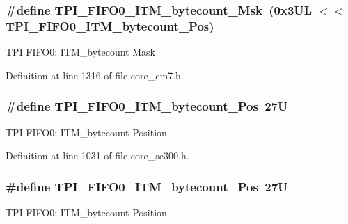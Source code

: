 \subsubsection[{\texorpdfstring{T\+P\+I\+\_\+\+F\+I\+F\+O0\+\_\+\+I\+T\+M\+\_\+bytecount\+\_\+\+Msk}{TPI_FIFO0_ITM_bytecount_Msk}}]{\setlength{\rightskip}{0pt plus 5cm}\#define T\+P\+I\+\_\+\+F\+I\+F\+O0\+\_\+\+I\+T\+M\+\_\+bytecount\+\_\+\+Msk~(0x3\+U\+L $<$$<$ T\+P\+I\+\_\+\+F\+I\+F\+O0\+\_\+\+I\+T\+M\+\_\+bytecount\+\_\+\+Pos)}\hypertarget{group___c_m_s_i_s___t_p_i_ga07bafa971b8daf0d63b3f92b9ae7fa16}{}\label{group___c_m_s_i_s___t_p_i_ga07bafa971b8daf0d63b3f92b9ae7fa16}
T\+PI F\+I\+F\+O0\+: I\+T\+M\+\_\+bytecount Mask 

Definition at line 1316 of file core\+\_\+cm7.\+h.

\subsubsection[{\texorpdfstring{T\+P\+I\+\_\+\+F\+I\+F\+O0\+\_\+\+I\+T\+M\+\_\+bytecount\+\_\+\+Pos}{TPI_FIFO0_ITM_bytecount_Pos}}]{\setlength{\rightskip}{0pt plus 5cm}\#define T\+P\+I\+\_\+\+F\+I\+F\+O0\+\_\+\+I\+T\+M\+\_\+bytecount\+\_\+\+Pos~27U}\hypertarget{group___c_m_s_i_s___t_p_i_gac2b6f7f13a2fa0be4aa7645a47dcac52}{}\label{group___c_m_s_i_s___t_p_i_gac2b6f7f13a2fa0be4aa7645a47dcac52}
T\+PI F\+I\+F\+O0\+: I\+T\+M\+\_\+bytecount Position 

Definition at line 1031 of file core\+\_\+sc300.\+h.

\subsubsection[{\texorpdfstring{T\+P\+I\+\_\+\+F\+I\+F\+O0\+\_\+\+I\+T\+M\+\_\+bytecount\+\_\+\+Pos}{TPI_FIFO0_ITM_bytecount_Pos}}]{\setlength{\rightskip}{0pt plus 5cm}\#define T\+P\+I\+\_\+\+F\+I\+F\+O0\+\_\+\+I\+T\+M\+\_\+bytecount\+\_\+\+Pos~27U}\hypertarget{group___c_m_s_i_s___t_p_i_gac2b6f7f13a2fa0be4aa7645a47dcac52}{}\label{group___c_m_s_i_s___t_p_i_gac2b6f7f13a2fa0be4aa7645a47dcac52}
T\+PI F\+I\+F\+O0\+: I\+T\+M\+\_\+bytecount Position 

